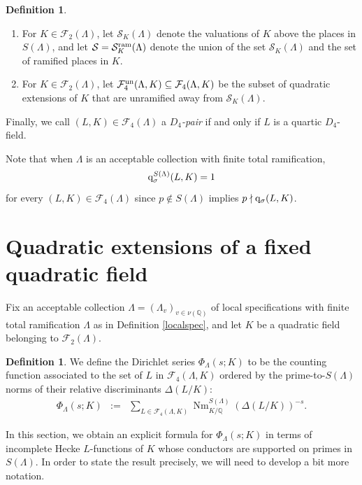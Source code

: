 \documentclass[10pt]{article}
\theoremstyle{plain}
\theoremstyle{definition}
\newtheorem{defn}[thm]{Definition}
\theoremstyle{remark}
\DeclareMathOperator{\Norm}{Nm}
\def\un{{\rm un}}
\def\Disc{{\Delta}}
\def\FF{{\mathcal F}}
\def\bQ{{\mathbb Q}}
\def\cF{{\mathcal F}}
\def\bQ{{\mathbb Q}}
\def\cS{{\mathcal S}}
\newcommand{\q}{{\rm q}}
\begin{document}
\begin{defn}
\begin{enumerate}
  \item[{\rm (e)}] For 
$K \in \FF_2(\Lambda)$, let $\cS_{K}(\Lambda)$ denote the valuations of $K$ above the
places in $S(\Lambda)$, and let
$\cS =\cS_K^{\rm ram}(\Lambda)$ denote the union of the set $\cS_K(\Lambda)$ and the set of
ramified places in $K$.
\item[{\rm (f)}] For $K\in\cF_2(\Lambda)$, let $\FF_4^\un(\Lambda,K)
  \subseteq \cF_4(\Lambda,K)$ be the subset of quadratic extensions
  of $K$ that are unramified away from $\cS_K(\Lambda)$.
\end{enumerate}
Finally, we call $(L,K) \in \FF_4(\Lambda)$ a {\em $D_4$-pair} if and only if $L$ is a quartic $D_4$-field. 
\end{defn}
Note that when $\Lambda$ is an acceptable collection with finite total ramification, $$\q_{\sigma}^{S(\Lambda)}(L,K) = 1$$ for every $(L,K) \in \FF_4(\Lambda)$ since $p \notin S(\Lambda)$ implies $p \nmid \q_{\sigma}(L,K)$.














\section{Quadratic extensions of a fixed quadratic field}

Fix an acceptable collection $\Lambda = (\Lambda_v)_{v\in \nu(\bQ)}$ of local
specifications with finite total ramification $\Lambda$ as in Definition \ref{localspec}, and let $K$ be a quadratic
field belonging to $\FF_2(\Lambda)$.
\begin{defn} We define the Dirichlet series
$\Phi_{\Lambda}(s;K)$ to be the counting function associated to the
set of $L$ in $\FF_4(\Lambda,K)$ ordered by
the prime-to-$S(\Lambda)$ norms of
their relative discriminants $\Disc(L/K)$:
\begin{equation}\label{Phi}
\begin{array}{rcl}
\Phi_{\Lambda}(s;K)&:=&\displaystyle\sum_{L
  \in\FF_4(\Lambda,K)}\Norm_{K/\bQ}^{S({\Lambda})}
(\Disc(L/K))^{-s}.
\end{array}
\end{equation}
\end{defn}
In this section, we obtain an explicit formula for
$\Phi_{\Lambda}(s;K)$ in terms of incomplete Hecke $L$-functions of
$K$ whose conductors are supported on primes in $S(\Lambda)$.
In order to state the result precisely, we will need to develop a bit more notation. 
\end{document}
